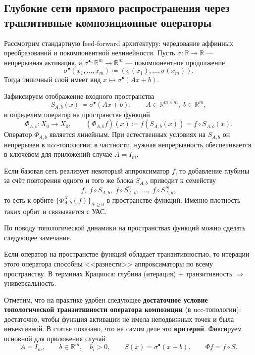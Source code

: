 \documentclass[../NDCNNAI_main.tex]{subfiles}
\begin{document}
\subsection*{Глубокие сети прямого распространения через транзитивные композиционные операторы}
Рассмотрим стандартную feed-forward архитектуру: чередование аффинных преобразований и
покомпонентной нелинейности. Пусть $\sigma\colon \mathbb{R}\to\mathbb{R}$ --- непрерывная активация,
а $\sigma^\bullet\colon \mathbb{R}^m\to\mathbb{R}^m$ --- покомпонентное продолжение,
\[
\sigma^\bullet(x_1,\dots,x_m) \coloneq  (\sigma(x_1),\dots,\sigma(x_m)).
\]
Тогда типичный слой имеет вид $x\mapsto \sigma^\bullet(Ax+b)$.

\begin{definition}
Зафиксируем отображение входного пространства
\[
S_{A,b}(x)\coloneq \sigma^\bullet(Ax+b),\qquad A\in\mathbb{R}^{m\times m},\; b\in\mathbb{R}^m,
\]
и определим оператор на пространстве функций
\begin{equation}
\Phi_{A,b}\colon X_0\to X_0,\qquad (\Phi_{A,b}f)(x)\coloneq f(S_{A,b}(x))=f\circ S_{A,b}(x).
\label{eq:phi_def}
\end{equation}
Оператор $\Phi_{A,b}$ является линейным. При естественных условиях на $S_{A,b}$ он непрерывен в ucc-топологии;
в частности, нужная непрерывность обеспечивается в ключевом для приложений случае $A=I_m$.
\end{definition}

\begin{remark}
Если базовая сеть реализует некоторый аппроксиматор $f$, то добавление глубины за счёт повторения одного и того же
блока $S_{A,b}$ приводит к семейству
\[
f,\; f\circ S_{A,b},\; f\circ S_{A,b}^{2},\;\dots,\; f\circ S_{A,b}^{N},
\]
то есть к орбите $\{ \Phi_{A,b}^N(f)\}_{N\ge 0}$ в пространстве функций. Именно плотность таких орбит и связывается с УАС.
\end{remark}

По поводу топологической динамики на пространствах функций можно сделать следующее замечание.
\begin{remark}
Если оператор на пространстве функций обладает транзитивностью,
то итерации этого оператора способны <<разнести>> аппроксиматоры по всему пространству.
В терминах Крациоса: глубина (итерация) + транзитивность $\Rightarrow$ универсальность.
\end{remark}

Отметим, что на практике удобен следующее \textbf{достаточное условие топологической транзитивности оператора композиции} (в ucc-топологии): достаточно, чтобы функция активации не имела неподвижных точек и была инъективной.
В статье показано, что на самом деле это \textbf{критерий}.
Фиксируем основной для приложения случай
\[
A=I_m,\qquad b\in\mathbb{R}^m,\quad b_i>0,
\qquad
S(x)=\sigma^\bullet(x+b),
\qquad
\Phi f=f\circ S.
\]
\end{document}
